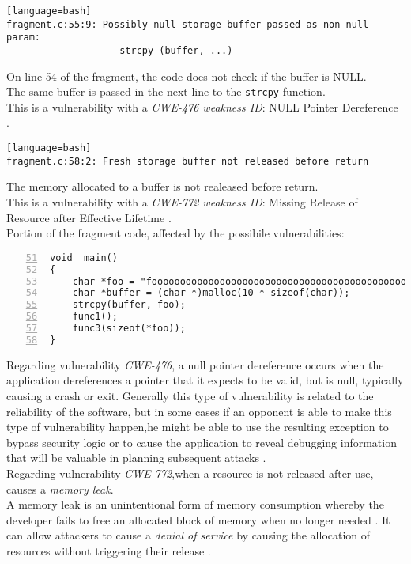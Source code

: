 \documentclass[a4paper,12pt]{article}
\begin{document}
\begin{lstlisting}[style=DOS][language=bash]
fragment.c:55:9: Possibly null storage buffer passed as non-null param:
                    strcpy (buffer, ...)
\end{lstlisting}
On line 54 of the fragment, the code does not check if the buffer is NULL.\\
The same buffer is passed in the next line to the \texttt{strcpy} function.\\
This is a vulnerability with a \textit{CWE-476 weakness ID}: NULL Pointer Dereference \cite{CWE476}.\\
\begin{lstlisting}[style=DOS][language=bash]
fragment.c:58:2: Fresh storage buffer not released before return
\end{lstlisting}
The memory allocated to a buffer is not  realeased before return.\\
This is a vulnerability with a \textit{CWE-772 weakness ID}: Missing Release of Resource after Effective Lifetime \cite{CWE772}.\\
\newpage
Portion of the fragment code, affected by the possibile vulnerabilities:
\begin{lstlisting}[style=c,numbers=left,firstnumber=51,linebackgroundcolor={
\ifnum\value{lstnumber}=54\color{red}\fi
\ifnum\value{lstnumber}=55\color{red}\fi
\ifnum\value{lstnumber}=58\color{red}\fi
}]
void  main()
{
	char *foo = "fooooooooooooooooooooooooooooooooooooooooooooooooooo";
	char *buffer = (char *)malloc(10 * sizeof(char));
	strcpy(buffer, foo);
	func1();
	func3(sizeof(*foo));
}
\end{lstlisting}
Regarding vulnerability \textit{CWE-476}, a null pointer dereference occurs when the application dereferences a pointer that it expects to be valid, but is null, typically causing a crash or exit.
Generally this type of vulnerability is related to the reliability of the software, but in some cases if an opponent is able to make this type of vulnerability happen,he might be able to use the resulting exception to bypass security logic or to cause the application to reveal debugging information that will be valuable in planning subsequent attacks \cite{nulldef}.\\
Regarding vulnerability \textit{CWE-772},when a resource is not released after use, causes a \textit{memory leak}.\\
A memory leak is an unintentional form of memory consumption whereby the developer fails to free an allocated block of memory when no longer needed \cite{memoryleak}. It can allow attackers to cause a \textit{denial of service} by causing the allocation of resources without triggering their release \cite{CWE772}.
\end{document}
